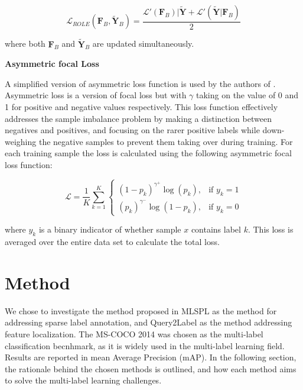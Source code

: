 \documentclass[lettersize,journal]{IEEEtran}
\renewcommand{\paragraph}[1]{%
  \vspace{1.5ex}\textbf{#1}\quad
}
\begin{document}
\begin{equation}
    \label{eq:role}
    \mathcal{L}_{ROLE}(\mathbf{F}_B, \mathbf{\tilde{Y}}_B) = \frac{\mathcal{L}'(\mathbf{F}_B)|\mathbf{\tilde{Y}}+\mathcal{L}'(\mathbf{\tilde{Y}}|\mathbf{F}_B)}{2}
\end{equation}

\noindent where both $\mathbf{F}_B$ and $\tilde{\mathbf{Y}}_B$ are updated simultaneously.

\paragraph{Asymmetric focal Loss}
\label{sec:afl}
A simplified version of asymmetric loss function is used by the authors of \cite{Query2Label}. Asymmetric loss is a version of focal loss but with $\gamma$ taking on the value of 0 and 1 for positive and negative values respectively. This loss function effectively addresses the sample imbalance problem by making a distinction between negatives and positives, and focusing on the rarer positive labels while down-weighing the negative samples to prevent them taking over during training. For each training sample the loss is calculated using the following asymmetric focal loss function:

\begin{equation}
    \mathcal{L} = \frac{1}{K} \sum_{k=1}^{K}
\begin{cases}
(1 - p_k)^{\gamma^+} \log(p_k), & \text{if } y_k = 1 \\
(p_k)^{\gamma^-} \log(1 - p_k), & \text{if } y_k = 0
\end{cases}
\end{equation}

\noindent where $y_k$ is a binary indicator of whether sample $x$ contains label $k$. This loss is averaged over the entire data set to calculate the total loss. 


\section{Method}
We chose to investigate the method proposed in MLSPL as the method for addressing sparse label annotation, and Query2Label as the method addressing feature localization. The MS-COCO 2014 was chosen as the multi-label classification becnhmark, as it is widely used in the multi-label learning field. Results are reported in mean Average Precision (mAP). In the following section, the rationale behind the chosen methods is outlined, and how each method aims to solve the multi-label learning challenges.
\end{document}
